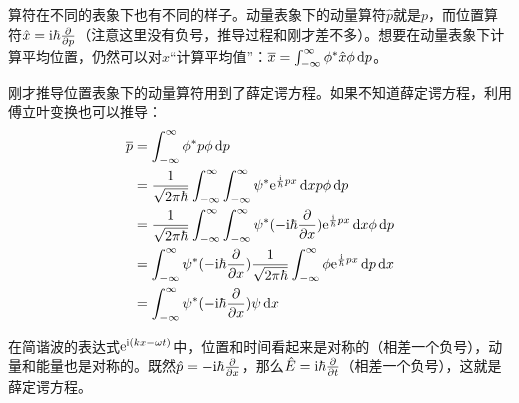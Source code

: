 算符在不同的表象下也有不同的样子。动量表象下的动量算符$\hat{p}$就是$p$，而位置算符$\hat{x}=\mathrm{i} \hbar \frac{\partial}{\partial p}$（注意这里没有负号，推导过程和刚才差不多）。想要在动量表象下计算平均位置，仍然可以对$\hat{x}$“计算平均值”：$\overline{x}=\int_{-\infty}^{\infty} \phi^* \hat{x} \phi \mathop{}\!\mathrm{d} p$。

刚才推导位置表象下的动量算符用到了薛定谔方程。如果不知道薛定谔方程，利用傅立叶变换也可以推导：
\begin{align*}
\overline{p}&=\int_{-\infty}^{\infty} \phi^* p \phi \opd p \\
&=\frac{1}{\sqrt{2 \pi \hbar}} \int_{-\infty}^{\infty} \int_{-\infty}^{\infty} \psi^* \rme^{\frac{\rmi}{\hbar} p x} \opd x p \phi \opd p \\
&=\frac{1}{\sqrt{2 \pi \hbar}} \int_{-\infty}^{\infty} \int_{-\infty}^{\infty} \psi^* (-\rmi \hbar \ppx) \rme^{\frac{\rmi}{\hbar} p x} \opd x \phi \opd p \\
&=\int_{-\infty}^{\infty} \psi^* (-\rmi \hbar \ppx) \frac{1}{\sqrt{2 \pi \hbar}} \int_{-\infty}^{\infty} \phi \rme^{\frac{\rmi}{\hbar} p x} \opd p \opd x \\
&=\int_{-\infty}^{\infty} \psi^* (-\rmi \hbar \ppx) \psi \opd x
\end{align*}

在简谐波的表达式$\mathrm{e}^{\mathrm{i}(k x-\omega t)}$中，位置和时间看起来是对称的（相差一个负号），动量和能量也是对称的。既然$\hat{p}=-\mathrm{i} \hbar \frac{\partial}{\partial x}$，那么$\hat{E}=\mathrm{i} \hbar \frac{\partial}{\partial t}$（相差一个负号），这就是薛定谔方程。
